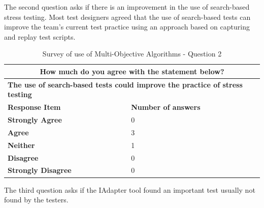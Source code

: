 \documentclass[espaco=umemeio,chapter=TITLE,twoside,openright]{abnt}
\begin{document}
The second question asks if there is an improvement in the use of search-based stress testing. Most test designers agreed that the use of search-based tests can improve the team's current test practice using an approach based on capturing and replay test scripts.

\begin{table}[h]
\centering
\caption{Survey of use of Multi-Objective Algorithms - Question 2}
\label{tab:question2}
\begin{tabular}{|l|l|}
\hline
\multicolumn{2}{|c|}{\cellcolor[HTML]{EFEFEF}\textbf{How much do you agree with the statement below?}}                            \\ \hline
\multicolumn{2}{|l|}{\cellcolor[HTML]{EFEFEF} \begin{minipage}{0.6\textwidth} \textbf{The use of search-based tests could improve the practice of stress testing} \end{minipage} } \\ \hline
\textbf{Response Item}                                                       & \textbf{Number of answers}                         \\ \hline
\cellcolor[HTML]{EFEFEF}\textbf{Strongly Agree}                              & 0                                                  \\ \hline
\cellcolor[HTML]{EFEFEF}\textbf{Agree}                                       & 3                                                  \\ \hline
\cellcolor[HTML]{EFEFEF}\textbf{Neither}                                     & 1                                                  \\ \hline
\cellcolor[HTML]{EFEFEF}\textbf{Disagree}                                     & 0                                                  \\ \hline
\cellcolor[HTML]{EFEFEF}\textbf{Strongly Disagree}                           & 0                                                  \\ \hline
\end{tabular}
\end{table}

The third question asks if the IAdapter tool  found an important test usually not found by the testers.
\end{document}
